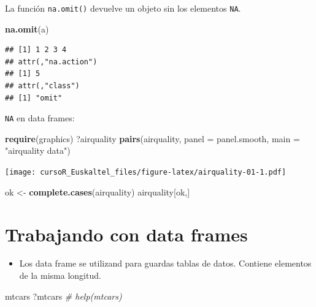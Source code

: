 \documentclass[]{book}
\newenvironment{Shaded}{\begin{snugshade}}{\end{snugshade}}
\newcommand{\KeywordTok}[1]{\textcolor[rgb]{0.13,0.29,0.53}{\textbf{#1}}}
\newcommand{\DataTypeTok}[1]{\textcolor[rgb]{0.13,0.29,0.53}{#1}}
\newcommand{\StringTok}[1]{\textcolor[rgb]{0.31,0.60,0.02}{#1}}
\newcommand{\CommentTok}[1]{\textcolor[rgb]{0.56,0.35,0.01}{\textit{#1}}}
\newcommand{\NormalTok}[1]{#1}
\providecommand{\tightlist}{%
  \setlength{\itemsep}{0pt}\setlength{\parskip}{0pt}}
\begin{document}
La función \texttt{na.omit()} devuelve un objeto sin los elementos
\texttt{NA}.

\begin{Shaded}
\begin{Highlighting}[]
\KeywordTok{na.omit}\NormalTok{(a) }
\end{Highlighting}
\end{Shaded}

\begin{verbatim}
## [1] 1 2 3 4
## attr(,"na.action")
## [1] 5
## attr(,"class")
## [1] "omit"
\end{verbatim}

\texttt{NA} en data frames:

\begin{Shaded}
\begin{Highlighting}[]
\KeywordTok{require}\NormalTok{(graphics)}
\NormalTok{?airquality}
\KeywordTok{pairs}\NormalTok{(airquality, }\DataTypeTok{panel =}\NormalTok{ panel.smooth, }\DataTypeTok{main =} \StringTok{"airquality data"}\NormalTok{)}
\end{Highlighting}
\end{Shaded}

\texttt{[image: cursoR\_Euskaltel\_files/figure-latex/airquality-01-1.pdf]}

\begin{Shaded}
\begin{Highlighting}[]
\NormalTok{ok <-}\StringTok{ }\KeywordTok{complete.cases}\NormalTok{(airquality)}
\NormalTok{airquality[ok,]}
\end{Highlighting}
\end{Shaded}

\section{Trabajando con data frames}\label{trabajando-con-data-frames-1}

\begin{itemize}
\tightlist
\item
  Los data frame se utilizand para guardas tablas de datos. Contiene
  elementos de la misma longitud.
\end{itemize}

\begin{Shaded}
\begin{Highlighting}[]
\NormalTok{mtcars}
\NormalTok{?mtcars       }\CommentTok{# help(mtcars)}
\end{Highlighting}
\end{Shaded}
\end{document}
